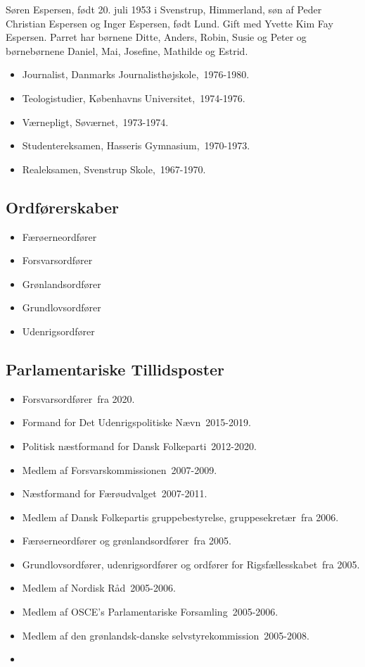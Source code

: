 \documentclass[11pt, a4paper]{awesome-cv}
\begin{document}
\makecvheader[R]
\makelettertitle
\begin{cvletter}
Søren Espersen, født 20. juli 1953 i Svenstrup, Himmerland, søn af Peder Christian Espersen og Inger Espersen, født Lund. Gift med Yvette Kim Fay Espersen. Parret har børnene Ditte, Anders, Robin, Susie og Peter og børnebørnene Daniel, Mai, Josefine, Mathilde og Estrid.



\begin{itemize}
\item Journalist, Danmarks Journalisthøjskole, 1976-1980.
\item Teologistudier, Københavns Universitet, 1974-1976.
\item Værnepligt, Søværnet, 1973-1974.
\item Studentereksamen, Hasseris Gymnasium, 1970-1973.
\item Realeksamen, Svenstrup Skole, 1967-1970.
\end{itemize}
\subsection*{Ordførerskaber}
\begin{itemize}
\item Færøerneordfører
\item Forsvarsordfører
\item Grønlandsordfører
\item Grundlovsordfører
\item Udenrigsordfører
\end{itemize}
\subsection*{Parlamentariske Tillidsposter}
\begin{itemize}
\item Forsvarsordfører fra 2020.
\item Formand for Det Udenrigspolitiske Nævn 2015-2019.
\item Politisk næstformand for Dansk Folkeparti 2012-2020.
\item Medlem af Forsvarskommissionen 2007-2009.
\item Næstformand for Færøudvalget 2007-2011.
\item Medlem af Dansk Folkepartis gruppebestyrelse, gruppesekretær fra 2006.
\item Færøerneordfører og grønlandsordfører fra 2005.
\item Grundlovsordfører, udenrigsordfører og ordfører for Rigsfællesskabet fra 2005.
\item Medlem af Nordisk Råd 2005-2006.
\item Medlem af OSCE's Parlamentariske Forsamling 2005-2006.
\item Medlem af den grønlandsk-danske selvstyrekommission 2005-2008.
\item  
\end{itemize}

\end{cvletter}
\end{document}
